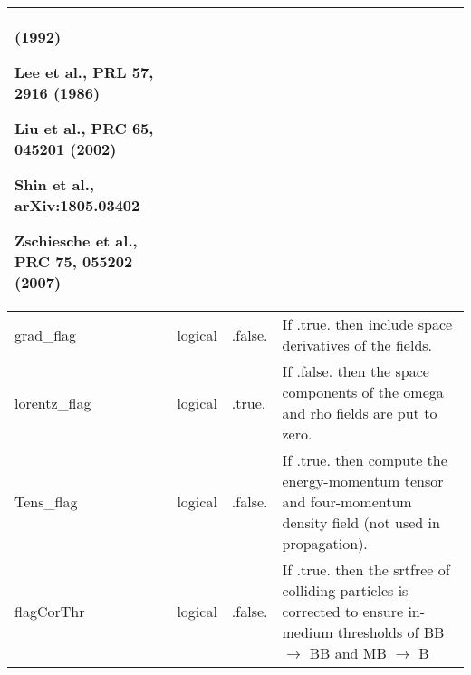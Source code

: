 \documentclass{article}
\begin{document}
\begin{longtable}{llll}
(1992)\item Lee et al., PRL 57, 2916 (1986)\item Liu et al., PRC 65, 045201 (2002)\item Shin et al., arXiv:1805.03402\item Zschiesche et al., PRC 75, 055202 (2007)\end{itemize}\end{minipage}\\*
\midrule
grad\_flag & \begin{minipage}[t]{2cm}logical\end{minipage} & \begin{minipage}[t]{2cm}.false.\end{minipage} & \begin{minipage}[t]{12cm}If .true. then include space derivatives of the fields.\end{minipage}\\*
\midrule
lorentz\_flag & \begin{minipage}[t]{2cm}logical\end{minipage} & \begin{minipage}[t]{2cm}.true.\end{minipage} & \begin{minipage}[t]{12cm}If .false. then the space components of the omega and rho fields are put to zero.\end{minipage}\\*
\midrule
Tens\_flag & \begin{minipage}[t]{2cm}logical\end{minipage} & \begin{minipage}[t]{2cm}.false.\end{minipage} & \begin{minipage}[t]{12cm}If .true. then compute the energy-momentum tensor and four-momentum density field (not used in propagation).\end{minipage}\\*
\midrule
flagCorThr & \begin{minipage}[t]{2cm}logical\end{minipage} & \begin{minipage}[t]{2cm}.false.\end{minipage} & \begin{minipage}[t]{12cm}If .true. then the srtfree of colliding particles is corrected to ensure in-medium thresholds of BB $\rightarrow$ BB and MB $\rightarrow$ B\end{minipage}\\*

\end{longtable}
\end{document}
